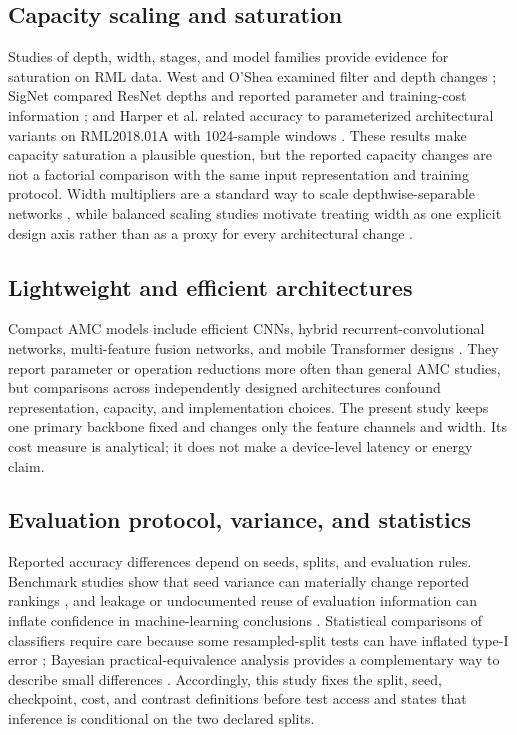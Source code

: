 \subsection{Capacity scaling and saturation}
Studies of depth, width, stages, and model families provide evidence for
saturation on RML data. West and O'Shea examined filter and depth changes
\cite{West2017Deep}; SigNet compared ResNet depths and reported parameter and
training-cost information \cite{Chen2022SigNet}; and Harper et al. related
accuracy to parameterized architectural variants on RML2018.01A with
1024-sample windows \cite{Harper2023AMC}. These results make capacity
saturation a plausible question, but the reported capacity changes are not a
factorial comparison with the same input representation and training protocol.
Width multipliers are a standard way to scale depthwise-separable networks
\cite{Howard2017MobileNets}, while balanced scaling studies motivate treating
width as one explicit design axis rather than as a proxy for every architectural
change \cite{Tan2019EfficientNet}.

\subsection{Lightweight and efficient architectures}
Compact AMC models include efficient CNNs, hybrid recurrent-convolutional
networks, multi-feature fusion networks, and mobile Transformer designs
\cite{HuynhThe2020MCNet,Lin2020HybridNet,Cui2023TimePhase,Li2023LightMFFS,
Fei2024MobileAmcT,Zheng2023MobileRaT,Wang2024ULNN,Quan2024ALWNN,Suman2025DPDRSN}.
They report parameter or operation reductions more often than general AMC
studies, but comparisons across independently designed architectures confound
representation, capacity, and implementation choices. The present study keeps
one primary backbone fixed and changes only the feature channels and width.
Its cost measure is analytical; it does not make a device-level latency or
energy claim.

\subsection{Evaluation protocol, variance, and statistics}
Reported accuracy differences depend on seeds, splits, and evaluation rules.
Benchmark studies show that seed variance can materially change reported
rankings \cite{Henderson2018DeepRL,Bouthillier2021Variance}, and leakage or
undocumented reuse of evaluation information can inflate confidence in
machine-learning conclusions \cite{Kapoor2023Leakage}. Statistical comparisons
of classifiers require care because some resampled-split tests can have
inflated type-I error \cite{Dietterich1998Tests}; Bayesian
practical-equivalence analysis provides a complementary way to describe small
differences \cite{Benavoli2017Time}. Accordingly, this study fixes the split,
seed, checkpoint, cost, and contrast definitions before test access and states
that inference is conditional on the two declared splits.

